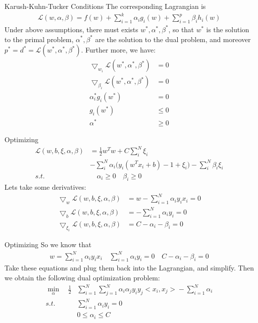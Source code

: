 \documentclass{beamer}
\begin{document}
\begin{frame}{Karush-Kuhn-Tucker Conditions}
The corresponding Lagrangian is 
\begin{gather*}
    \mathcal{L}(w, \alpha, \beta) = f(w) + \sum_{i=1}^k{\alpha_i g_i(w)} + \sum_{i=1}^p{\beta_i h_i(w)}
\end{gather*}
Under above assumptions, there must exists $w^*, \alpha^*, \beta^*$, so that $w^*$ is the solution to the primal problem, $\alpha^*, \beta^*$ are the solution to the dual problem, and moreover $p^* = d^* = \mathcal{L}(w^*, \alpha^*, \beta^*)$. Further more, we have:
\begin{align}
    \bigtriangledown_{w_i}\mathcal{L}(w^*, \alpha^*, \beta^*) &= 0 \\
    \bigtriangledown_{\beta_i}\mathcal{L}(w^*, \alpha^*, \beta^*) &= 0 \\
    \alpha^*_i g_i(w^*) &= 0 \\
    g_i(w^*) &\leq 0 \\
    \alpha^* &\geq 0
\end{align}
\end{frame}

\begin{frame}{Optimizing}
\begin{align*}
\mathcal{L}(w, b, \xi, \alpha, \beta) &= \frac{1}{2}w^T w+C\sum_i^N{\xi_i} \\ &-\sum_i^N{\alpha_i \biggl( y_i (w^T x_i + b) - 1 + \xi_i \biggr)} - \sum_i^N{\beta_i \xi_i} \\
s.t. &\quad \alpha_i \geq 0 \quad \beta_i \geq 0
\end{align*}
Lets take some derivatives:
\begin{align*}
\bigtriangledown_w\mathcal{L}(w, b, \xi, \alpha, \beta) &= w - \sum_{i=1}^N{\alpha_i y_i x_i} = 0 \\
\bigtriangledown_b\mathcal{L}(w, b, \xi, \alpha, \beta) &= -\sum_{i=1}^N{\alpha_i y_i} = 0 \\
\bigtriangledown_{\xi_i}\mathcal{L}(w, b, \xi, \alpha, \beta) &= C - \alpha_i - \beta_i = 0
\end{align*}
\end{frame}

\begin{frame}{Optimizing}
So we know that
\begin{gather*}
    w = \sum_{i=1}^N{\alpha_i y_i x_i} \quad
    \sum_{i=1}^N{\alpha_i y_i} = 0 \quad
    C - \alpha_i - \beta_i = 0
\end{gather*}
Take these equations and plug them back into the Lagrangian, and simplify. Then we obtain the following dual optimization problem:
\begin{align*}
    \min_\alpha \quad \frac{1}{2} &\sum_{i=1}^N \sum_{j=1}^N \alpha_i \alpha_j y_i y_j \bigl< x_i,x_j \bigr> - \sum_{i=1}^N \alpha_i \\
    s.t. \quad & \sum_{i=1}^N \alpha_i y_i = 0 \\
    & 0 \leq \alpha_i \leq C
\end{align*}
\end{frame}
\end{document}
